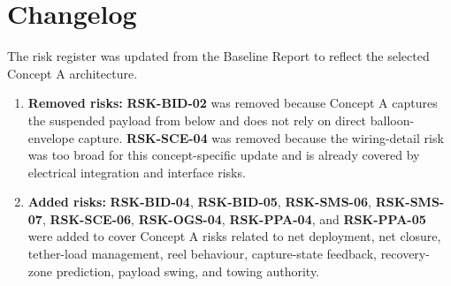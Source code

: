 






\section{Changelog}
\label{sec:Risk_Changelog}

The risk register was updated from the Baseline Report to reflect the selected Concept A architecture.

\begin{enumerate}
    \item \textbf{Removed risks:} \textbf{RSK-BID-02} was removed because Concept A captures the suspended payload from below and does not rely on direct balloon-envelope capture. \textbf{RSK-SCE-04} was removed because the wiring-detail risk was too broad for this concept-specific update and is already covered by electrical integration and interface risks.

    \item \textbf{Added risks:} \textbf{RSK-BID-04}, \textbf{RSK-BID-05}, \textbf{RSK-SMS-06}, \textbf{RSK-SMS-07}, \textbf{RSK-SCE-06}, \textbf{RSK-OGS-04}, \textbf{RSK-PPA-04}, and \textbf{RSK-PPA-05} were added to cover Concept A risks related to net deployment, net closure, tether-load management, reel behaviour, capture-state feedback, recovery-zone prediction, payload swing, and towing authority.

\end{enumerate}